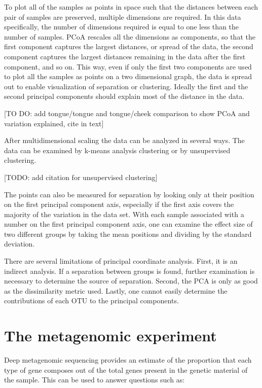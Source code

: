 To plot all of the samples as points in space such that the distances between each pair of samples are preserved, multiple dimensions are required. In this data specifically, the number of dimensions required is equal to one less than the number of samples. PCoA rescales all the dimensions as components, so that the first component captures the largest distances, or spread of the data, the second component captures the largest distances remaining in the data after the first component, and so on. This way, even if only the first two components are used to plot all the samples as points on a two dimensional graph, the data is spread out to enable visualization of separation or clustering. Ideally the first and the second principal components should explain most of the distance in the data.

[TO DO: add tongue/tongue and tongue/cheek comparison to show PCoA and variation explained, cite in text]

After multidimensional scaling the data can be analyzed in several ways. The data can be examined by k-means analysis clustering \cite{tibshirani2005cluster} or by unsupervised clustering.

[TODO: add citation for unsupervised clustering]

The points can also be measured for separation by looking only at their position on the first principal component axis, especially if the first axis covers the majority of the variation in the data set. With each sample associated with a number on the first principal component axis, one can examine the effect size of two different groups by taking the mean positions and dividing by the standard deviation.

There are several limitations of principal coordinate analysis. First, it is an indirect analysis. If a separation between groups is found, further examination is necessary to determine the source of separation. Second, the PCA is only as good as the dissimilarity metric used. Lastly, one cannot easily determine the contributions of each OTU to the principal components.

\section{The metagenomic experiment}
Deep metagenomic sequencing provides an estimate of the proportion that each type of gene composes out of the total genes present in the genetic material of the sample. This can be used to answer questions such as:

